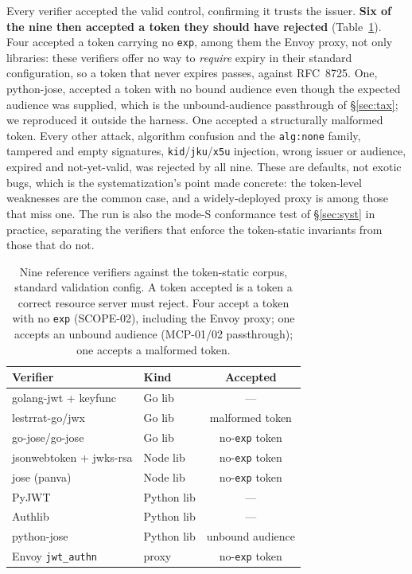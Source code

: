Every verifier accepted the valid control, confirming it trusts the issuer. \textbf{Six
of the nine then accepted a token they should have rejected} (Table~\ref{tab:eval}).
Four accepted a token carrying no \texttt{exp}, among them the Envoy proxy, not only
libraries: these verifiers offer no way to \emph{require} expiry in their standard
configuration, so a token that never expires passes, against RFC~8725. One, python-jose,
accepted a token with no bound audience even though the expected audience was supplied,
which is the unbound-audience passthrough of \S\ref{sec:tax}; we reproduced it outside
the harness. One accepted a structurally malformed token. Every other attack, algorithm
confusion and the \texttt{alg:none} family, tampered and empty signatures,
\texttt{kid}/\texttt{jku}/\texttt{x5u} injection, wrong issuer or audience, expired and
not-yet-valid, was rejected by all nine. These are defaults, not exotic bugs, which is
the systematization's point made concrete: the token-level weaknesses are the common
case, and a widely-deployed proxy is among those that miss one. The run is also the
mode-\textsf{S} conformance test of \S\ref{sec:syst} in practice, separating the
verifiers that enforce the token-static invariants from those that do not.

\begin{table}[t]
\centering\footnotesize
\caption{Nine reference verifiers against the token-static corpus, standard validation
config. A token accepted is a token a correct resource server must reject. Four accept
a token with no \texttt{exp} (SCOPE-02), including the Envoy proxy; one accepts an
unbound audience (MCP-01/02 passthrough); one accepts a malformed token.}
\label{tab:eval}
\begin{tabular}{@{}llc@{}}
\toprule
Verifier & Kind & Accepted \\
\midrule
golang-jwt + keyfunc & Go lib & --- \\
lestrrat-go/jwx      & Go lib & malformed token \\
go-jose/go-jose      & Go lib & no-\texttt{exp} token \\
jsonwebtoken + jwks-rsa & Node lib & no-\texttt{exp} token \\
jose (panva)         & Node lib & no-\texttt{exp} token \\
PyJWT                & Python lib & --- \\
Authlib              & Python lib & --- \\
python-jose          & Python lib & unbound audience \\
Envoy \texttt{jwt\_authn} & proxy & no-\texttt{exp} token \\
\bottomrule
\end{tabular}
\end{table}

